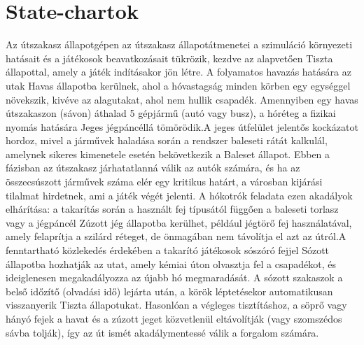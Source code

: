 \section{State-chartok}
\clearpage
\par{Az útszakasz állapotgépen az útszakasz állapotátmenetei a szimuláció környezeti hatásait és a játékosok beavatkozásait tükrözik, kezdve az alapvetően Tiszta állapottal, amely a játék indításakor jön létre. A folyamatos havazás hatására az utak Havas állapotba kerülnek, ahol a hóvastagság minden körben egy egységgel növekszik, kivéve az alagutakat, ahol nem hullik csapadék. Amennyiben egy havas útszakaszon (sávon) áthalad 5 gépjármű (autó vagy busz), a hóréteg a fizikai nyomás hatására Jeges jégpáncéllá tömörödik.A jeges útfelület jelentős kockázatot hordoz, mivel a járművek haladása során a rendszer baleseti rátát kalkulál, amelynek sikeres kimenetele esetén bekövetkezik a Baleset állapot. Ebben a fázisban az útszakasz járhatatlanná válik az autók számára, és ha az összecsúszott járművek száma elér egy kritikus határt, a városban kijárási tilalmat hirdetnek, ami a játék végét jelenti. A hókotrók feladata ezen akadályok elhárítása: a takarítás során a használt fej típusától függően a baleseti torlasz vagy a jégpáncél Zúzott jég állapotba kerülhet, például jégtörő fej használatával, amely felaprítja a szilárd réteget, de önmagában nem távolítja el azt az útról.A fenntartható közlekedés érdekében a takarító játékosok sószóró fejjel Sózott állapotba hozhatják az utat, amely kémiai úton olvasztja fel a csapadékot, és ideiglenesen megakadályozza az újabb hó megmaradását. A sózott szakaszok a belső időzítő (olvadási idő) lejárta után, a körök léptetésekor automatikusan visszanyerik Tiszta állapotukat. Hasonlóan a végleges tisztításhoz, a söprő vagy hányó fejek a havat és a zúzott jeget közvetlenül eltávolítják (vagy szomszédos sávba tolják), így az út ismét akadálymentessé válik a forgalom számára.}
